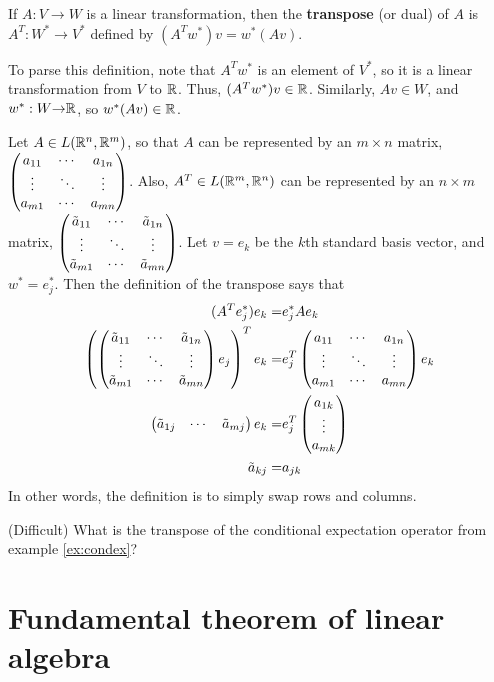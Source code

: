 \begin{definition}
  If $A: V \to W$ is a linear transformation, then the
  \textbf{transpose} (or dual) of $A$ is $A^T: W^\ast \to V^\ast$
  defined by $(A^Tw^\ast)v = w^\ast(Av)$.
\end{definition}
To parse this definition, note that $A^T w^\ast$ is an element of
$V^\ast$, so it is a linear transformation from $V$ to $\mathbb{R}$. Thus,
$(A^T w^\ast) v \in \mathbb{R}$. Similarly, $Av \in W$, and $w^\ast: W {\rightarrow}
\mathbb{R}$, so $w^\ast (A v) \in \mathbb{R}$. 
\begin{example}
  Let $A \in L(\mathbb{R}^n, \mathbb{R}^m)$, so that $A$ can be represented by an $m
  \times n$ matrix, $\begin{pmatrix} {a}_{11} & \cdots & {a}_{1n} \\ \vdots & \ddots & \vdots \\ {a}_{m1} & \cdots & {a}_{mn} \end{pmatrix}$. Also, $A^T \in L(\mathbb{R}^m, \mathbb{R}^n)$ can
  be represented by an $n \times m$ matrix, $\begin{pmatrix} {\tilde{a}}_{11} & \cdots & {\tilde{a}}_{1n} \\ \vdots & \ddots & \vdots \\ {\tilde{a}}_{m1} & \cdots & {\tilde{a}}_{mn} \end{pmatrix}$. Let
  $v = e_k$ be the $k$th standard basis vector, and $w^\ast =
  e_j^\ast$. Then the definition of the transpose says that
  \begin{align*}
    (A^T e_j^\ast) e_k = & e_j^\ast A e_k  \\
    \left(\begin{pmatrix} {\tilde{a}}_{11} & \cdots & {\tilde{a}}_{1n} \\ \vdots & \ddots & \vdots \\ {\tilde{a}}_{m1} & \cdots & {\tilde{a}}_{mn} \end{pmatrix} e_j\right)^T e_k = & e_j^T \begin{pmatrix} {a}_{11} & \cdots & {a}_{1n} \\ \vdots & \ddots & \vdots \\ {a}_{m1} & \cdots & {a}_{mn} \end{pmatrix}
    e_k \\
    \begin{pmatrix} \tilde{a}_{1j} & \cdots &  \tilde{a}_{mj}
    \end{pmatrix} e_k  = & e_j^T \begin{pmatrix} a_{1k} \\ \vdots \\  a_{mk}
    \end{pmatrix} \\
    \tilde{a}_{kj} = & a_{jk}
  \end{align*}
  In other words, the definition is to simply swap rows and columns.  
\end{example}
\begin{exercise}(Difficult) What is the transpose of the conditional
  expectation operator from example \ref{ex:condex}?
\end{exercise}

\section{Fundamental theorem of linear algebra}

